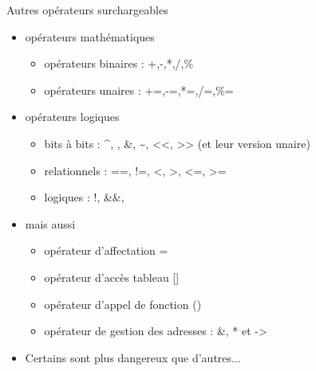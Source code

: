 \begin{frame}{Autres opérateurs surchargeables}

\begin{itemize}
\itemsep1pt\parskip0pt
\item
  opérateurs mathématiques

  \begin{itemize}
  \itemsep1pt\parskip0pt
  \item
    opérateurs binaires : +,-,*,/,\%
  \item
    opérateurs unaires : +=,-=,*=,/=,\%=
  \end{itemize}
\item
  opérateurs logiques

  \begin{itemize}
  \itemsep1pt\parskip0pt
  \item
    bits à bits : \^{}, \textbar{}, \&, \textasciitilde{},
    \textless{}\textless{}, \textgreater{}\textgreater{} (et leur
    version unaire)
  \item
    relationnels : ==, !=, \textless{}, \textgreater{}, \textless{}=,
    \textgreater{}=
  \item
    logiques : !, \&\&, \textbar{}\textbar{}
  \end{itemize}
\item
  mais aussi

  \begin{itemize}
  \itemsep1pt\parskip0pt
  \item
    opérateur d'affectation =
  \item
    opérateur d'accès tableau {[}{]}
  \item
    opérateur d'appel de fonction ()
  \item
    opérateur de gestion des adresses : \&, * et -\textgreater{}
  \end{itemize}
  \item Certains sont plus dangereux que d'autres...
\end{itemize}

\end{frame}

